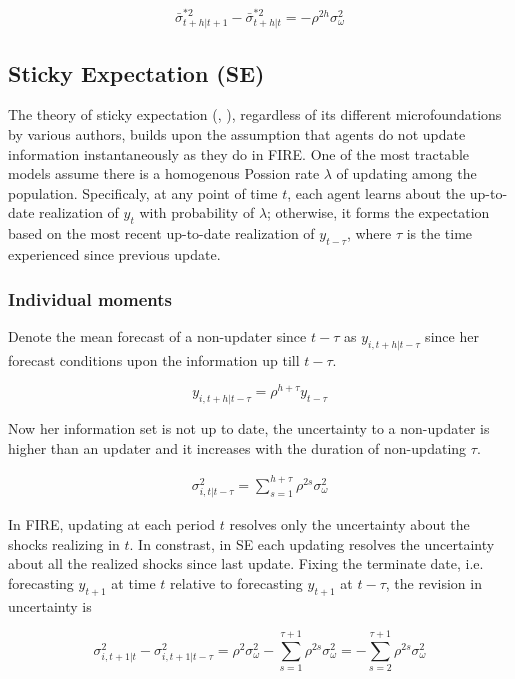 \documentclass[]{article}
\begin{document}
$$\bar \sigma^{*2}_{t+h|t+1} - \bar \sigma^{*2}_{t+h|t} = - \rho^{2h}\sigma^2_\omega$$


\subsection{Sticky Expectation (SE)}

The theory of sticky expectation (\citet{xx}, \citet{xx} ), regardless of its different microfoundations by various authors, builds upon the assumption that agents do not update information instantaneously as they do in FIRE. One of the most tractable models assume there is a homogenous Possion rate $\lambda$ of updating among the population. Specificaly, at any point of time $t$, each agent learns about the up-to-date realization of $y_t$ with probability of $\lambda$; otherwise, it forms the expectation based on the most recent up-to-date realization of $y_{t-\tau}$, where $\tau$ is the time experienced since previous update. 




\subsubsection{Individual moments} 

Denote the mean forecast of a non-updater since $t-\tau$ as $y_{i,t+h|t-\tau}$ since her forecast conditions upon the information up till $t-\tau$.

$$y_{i,t+h|t-\tau} = \rho^{h+\tau} y_{t-\tau}$$

Now her information set is not up to date, the uncertainty to a non-updater is higher than an updater and it increases with the duration of non-updating $\tau$. 

\begin{eqnarray}\label{VarSEInd}
	\sigma^2_{i,t|t-\tau}= \sum^{h+\tau}_{s=1}\rho^{2s} \sigma^2_{\omega}
\end{eqnarray}	
 
In FIRE, updating at each period $t$ resolves only the uncertainty about the shocks realizing in $t$. In constrast, in SE each updating resolves the uncertainty about all the realized shocks since last update. Fixing the terminate date, i.e. forecasting  $y_{t+1}$ at time $t$ relative to forecasting $y_{t+1}$ at $t-\tau$, the revision in uncertainty is 

$$\sigma^2_{i,t+1|t} - \sigma^2_{i,t+1|t-\tau} = \rho^{2} \sigma^2_{\omega} - \sum^{\tau+1}_{s=1}\rho^{2s} \sigma^2_{\omega} = -\sum^{\tau+1}_{s=2} \rho^{2s}\sigma^2_{\omega}$$
\end{document}
